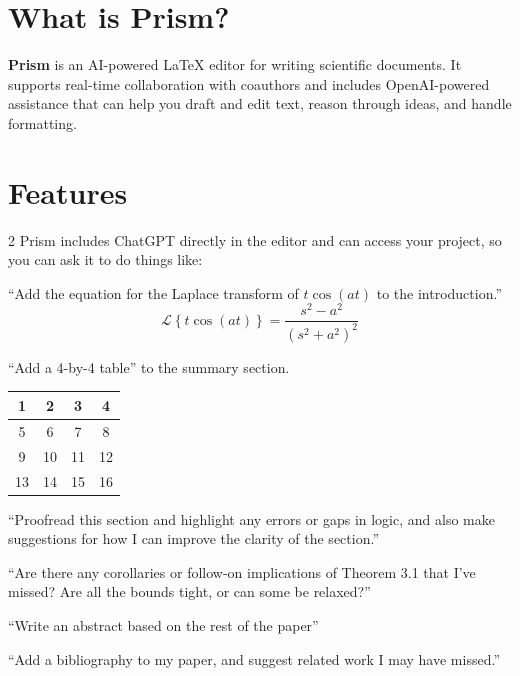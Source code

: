 \documentclass[11pt]{article}
\begin{document}
\pagestyle{empty}

\section*{What is Prism?}

\textbf{Prism} is an AI-powered \LaTeX{} editor for writing scientific documents. It supports real-time collaboration with coauthors and includes OpenAI-powered assistance that can help you draft and edit text, reason through ideas, and handle formatting.

\section*{Features}

\begin{multicols}{2}
Prism includes ChatGPT directly in the editor and can access your project, so you can ask it to do things like:

``Add the equation for the Laplace transform of $t\cos(at)$ to the introduction.''
\[
  \mathcal{L}\left\{ t \cos(a t) \right\} = \frac{ s^2 - a^2 }{ (s^2 + a^2)^2 }
\]

``Add a 4-by-4 table'' to the summary section.
\begin{center}
\begin{tabular}{|c|c|c|c|}
  \hline
  1 & 2 & 3 & 4 \\
  \hline
  5 & 6 & 7 & 8 \\
  \hline
  9 & 10 & 11 & 12 \\
  \hline
  13 & 14 & 15 & 16 \\
  \hline
\end{tabular}
\end{center}

``Proofread this section and highlight any errors or gaps in logic, and also make suggestions for how I can improve the clarity of the section.''

``Are there any corollaries or follow-on implications of Theorem 3.1 that I've missed? Are all the bounds tight, or can some be relaxed?''

``Write an abstract based on the rest of the paper''

``Add a bibliography to my paper, and suggest related work I may have missed.''


\end{multicols}
\end{document}
